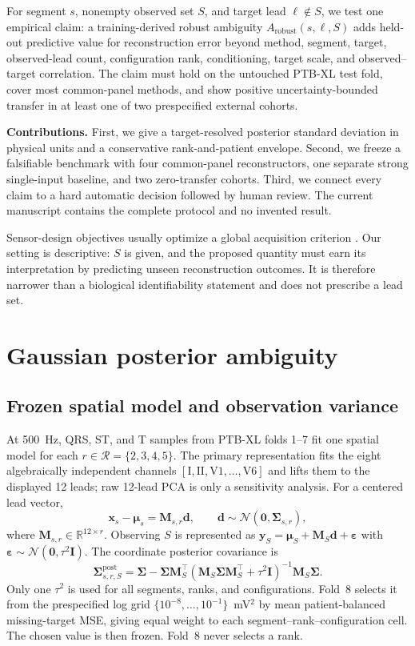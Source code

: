 \documentclass{article}
\begin{document}
For segment $s$, nonempty observed set $S$, and target lead $\ell\notin S$, we test one empirical
claim: a training-derived robust ambiguity $A_{\mathrm{robust}}(s,\ell,S)$ adds held-out predictive
value for reconstruction error beyond method, segment, target, observed-lead count, configuration
rank, conditioning, target scale, and observed--target correlation.  The claim must hold on the
untouched PTB-XL test fold, cover most common-panel methods, and show positive uncertainty-bounded
transfer in at least one of two prespecified external cohorts.

\noindent\textbf{Contributions.}  First, we give a target-resolved posterior standard deviation in
physical units and a conservative rank-and-patient envelope.  Second, we freeze a falsifiable
benchmark with four common-panel reconstructors, one separate strong single-input baseline, and two
zero-transfer cohorts.  Third, we connect every claim to a hard automatic decision followed by
human review.  The current manuscript contains the complete protocol and no invented result.

Sensor-design objectives usually optimize a global acquisition criterion \cite{joshi2009sensor}.
Our setting is descriptive: $S$ is given, and the proposed quantity must earn its interpretation by
predicting unseen reconstruction outcomes.  It is therefore narrower than a biological
identifiability statement and does not prescribe a lead set.

\section{Gaussian posterior ambiguity}
\label{sec:map}
\subsection{Frozen spatial model and observation variance}
At 500~Hz, QRS, ST, and T samples from PTB-XL folds 1--7 fit one spatial model for each
$r\in\mathcal R=\{2,3,4,5\}$.  The primary representation fits the eight algebraically independent
channels $[\mathrm I,\mathrm{II},\mathrm{V1},\ldots,\mathrm{V6}]$ and lifts them to the displayed
12 leads; raw 12-lead PCA is only a sensitivity analysis.  For a centered lead vector,
\begin{equation}
 \bm x_s-\bm\mu_s=\bm M_{s,r}\bm d,\qquad
 \bm d\sim\mathcal N(\bm0,\bm\Sigma_{s,r}),
 \label{eq:prior}
\end{equation}
where $\bm M_{s,r}\in\mathbb R^{12\times r}$.  Observing $S$ is represented as
$\bm y_S=\bm\mu_S+\bm M_{S}\bm d+\bm\varepsilon$ with
$\bm\varepsilon\sim\mathcal N(\bm0,\tau^2\bm I)$.  The coordinate posterior covariance is
\begin{equation}
 \bm\Sigma^{\mathrm{post}}_{s,r,S}=\bm\Sigma-
 \bm\Sigma\bm M_S^\top(\bm M_S\bm\Sigma\bm M_S^\top+\tau^2\bm I)^{-1}
 \bm M_S\bm\Sigma .
 \label{eq:posterior}
\end{equation}
Only one $\tau^2$ is used for all segments, ranks, and configurations.  Fold~8 selects it from the
prespecified log grid $\{10^{-8},\ldots,10^{-1}\}$~mV$^2$ by mean patient-balanced missing-target
MSE, giving equal weight to each segment--rank--configuration cell.  The chosen value is then
frozen.  Fold~8 never selects a rank.
\end{document}
